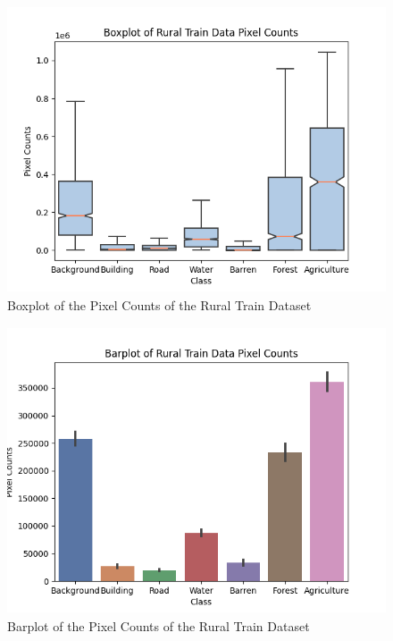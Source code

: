 \FloatBarrier
\begin{figure}[!h]
\includegraphics[width=15.0cm, height=8.5cm]{images/rural train boxplot.png}
\centering
\caption{Boxplot of the Pixel Counts of the Rural Train Dataset}
\label{fig:boxplot-rural-train}
\end{figure}

\begin{figure}[!h]
\includegraphics[width=15.0cm, height=8.5cm]{images/rural train barplot.png}
\centering
\caption{Barplot of the Pixel Counts of the Rural Train Dataset}
\label{fig:barplot-rural-train}
\end{figure}


